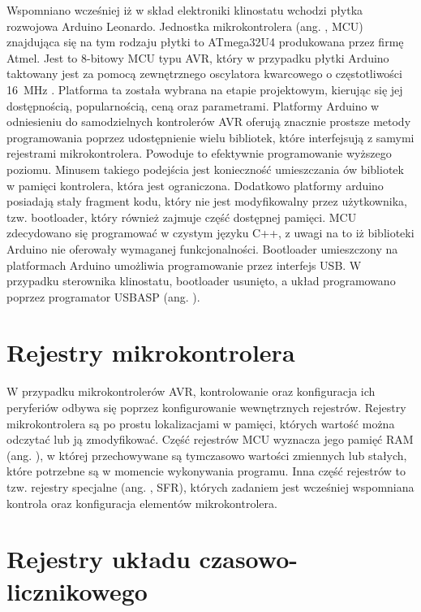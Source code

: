 Wspomniano wcześniej iż w skład elektroniki klinostatu wchodzi płytka rozwojowa Arduino Leonardo. Jednostka mikrokontrolera (ang. , MCU) znajdująca się na tym rodzaju płytki to ATmega32U4 produkowana przez firmę Atmel. Jest to 8-bitowy MCU typu AVR, który w przypadku płytki Arduino taktowany jest za pomocą zewnętrznego oscylatora kwarcowego o częstotliwości \SI{16}{MHz} \cite{bib:nota_katalogowa}. Platforma ta została wybrana na etapie projektowym, kierując się jej dostępnością, popularnością, ceną oraz parametrami. Platformy Arduino w odniesieniu do samodzielnych kontrolerów AVR oferują znacznie prostsze metody programowania poprzez udostępnienie wielu bibliotek, które interfejsują z samymi rejestrami mikrokontrolera. Powoduje to efektywnie programowanie wyższego poziomu. Minusem takiego podejścia jest konieczność umieszczania ów bibliotek \linebreak w pamięci kontrolera, która jest ograniczona. Dodatkowo platformy arduino posiadają stały fragment kodu, który nie jest modyfikowalny przez użytkownika, tzw. bootloader, który również zajmuje część dostępnej pamięci. MCU zdecydowano się programować w czystym języku C++, z uwagi na to iż biblioteki Arduino nie oferowały wymaganej funkcjonalności. Bootloader umieszczony na platformach Arduino umożliwia programowanie przez interfejs USB. W przypadku sterownika klinostatu, bootloader usunięto, a układ programowano poprzez programator USBASP (ang. ).

\section{Rejestry mikrokontrolera}

W przypadku mikrokontrolerów AVR, kontrolowanie oraz konfiguracja ich peryferiów odbywa się poprzez konfigurowanie wewnętrznych rejestrów. Rejestry mikrokontrolera są po prostu lokalizacjami w pamięci, których wartość można odczytać lub ją zmodyfikować. Część rejestrów MCU wyznacza jego pamięć RAM (ang. ), w której przechowywane są tymczasowo wartości zmiennych lub stałych, które potrzebne są w momencie wykonywania programu. Inna część rejestrów to tzw. rejestry specjalne (ang. , SFR), których zadaniem jest wcześniej wspomniana kontrola oraz konfiguracja elementów mikrokontrolera.

\section{Rejestry układu czasowo-licznikowego}

